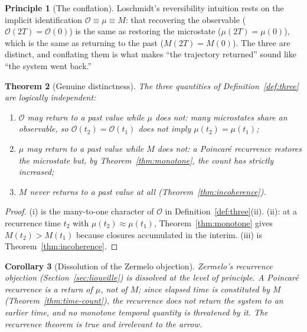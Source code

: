 \documentclass[11pt,a4paper]{article}
\theoremstyle{thmstyle}
\newtheorem{theorem}{Theorem}[section]
\newtheorem{corollary}[theorem]{Corollary}
\theoremstyle{definition}
\newtheorem{principle}[theorem]{Principle}
\theoremstyle{remark}
\newcommand{\Count}{M}
\newcommand{\Obs}{\mathcal{O}}
\newcommand{\Mic}{\mu}
\begin{document}
\begin{principle}[The conflation]
\label{prin:conflation}
Loschmidt's reversibility intuition rests on the implicit identification
$\Obs\equiv\Mic\equiv\Count$: that recovering the observable
($\Obs(2T)=\Obs(0)$) is the same as restoring the microstate
($\Mic(2T)=\Mic(0)$), which is the same as returning to the past
($\Count(2T)=\Count(0)$). The three are distinct, and conflating them is
what makes ``the trajectory returned'' sound like ``the system went
back.''
\end{principle}

\begin{theorem}[Genuine distinctness]
\label{thm:distinct}
The three quantities of Definition~\ref{def:three} are logically
independent:
\begin{enumerate}[leftmargin=1.7em,label=(\roman*),itemsep=0.2em]
\item $\Obs$ may return to a past value while $\Mic$ does not: many
microstates share an observable, so $\Obs(t_{2})=\Obs(t_{1})$ does not
imply $\Mic(t_{2})=\Mic(t_{1})$;
\item $\Mic$ may return to a past value while $\Count$ does not: a
Poincar\'e recurrence restores the microstate but, by
Theorem~\ref{thm:monotone}, the count has strictly increased;
\item $\Count$ never returns to a past value at all
(Theorem~\ref{thm:incoherence}).
\end{enumerate}
\end{theorem}

\begin{proof}
(i) is the many-to-one character of $\Obs$ in
Definition~\ref{def:three}(ii). (ii): at a recurrence time $t_{2}$ with
$\Mic(t_{2})\approx\Mic(t_{1})$, Theorem~\ref{thm:monotone} gives
$\Count(t_{2})>\Count(t_{1})$ because closures accumulated in the
interim. (iii) is Theorem~\ref{thm:incoherence}.
\end{proof}

\begin{corollary}[Dissolution of the Zermelo objection]
\label{cor:zermelo}
Zermelo's recurrence objection (Section~\ref{sec:liouville}) is
dissolved at the level of principle. A Poincar\'e recurrence is a return
of $\Mic$, not of $\Count$; since elapsed time is constituted by
$\Count$ (Theorem~\ref{thm:time-count}), the recurrence does not return
the system to an earlier time, and no monotone temporal quantity is
threatened by it. The recurrence theorem is true and irrelevant to the
arrow.
\end{corollary}
\end{document}
